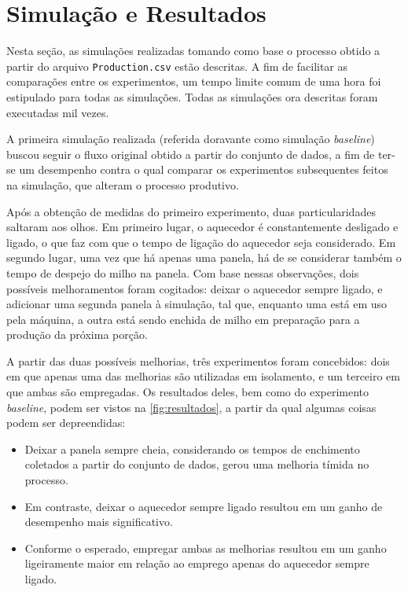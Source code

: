 \documentclass[12pt]{article}
\begin{document}
\section{Simulação e Resultados}
\label{sec:simulacao_resultados}

Nesta seção, as simulações realizadas tomando como base o processo obtido a partir do arquivo \texttt{Production.csv} estão descritas. A fim de facilitar as comparações entre os experimentos, um tempo limite comum de uma hora foi estipulado para todas as simulações. Todas as simulações ora descritas foram executadas mil vezes.

A primeira simulação realizada (referida doravante como simulação \textit{baseline}) buscou seguir o fluxo original obtido a partir do conjunto de dados, a fim de ter-se um desempenho contra o qual comparar os experimentos subsequentes feitos na simulação, que alteram o processo produtivo.

Após a obtenção de medidas do primeiro experimento, duas particularidades saltaram aos olhos. Em primeiro lugar, o aquecedor é constantemente desligado e ligado, o que faz com que o tempo de ligação do aquecedor seja considerado. Em segundo lugar, uma vez que há apenas uma panela, há de se considerar também o tempo de despejo do milho na panela. Com base nessas observações, dois possíveis melhoramentos foram cogitados: deixar o aquecedor sempre ligado, e adicionar uma segunda panela à simulação, tal que, enquanto uma está em uso pela máquina, a outra está sendo enchida de milho em preparação para a produção da próxima porção.

A partir das duas possíveis melhorias, três experimentos foram concebidos: dois em que apenas uma das melhorias são utilizadas em isolamento, e um terceiro em que ambas são empregadas. Os resultados deles, bem como do experimento \textit{baseline}, podem ser vistos na \autoref{fig:resultados}, a partir da qual algumas coisas podem ser depreendidas:

\begin{itemize}
    \item Deixar a panela sempre cheia, considerando os tempos de enchimento coletados a partir do conjunto de dados, gerou uma melhoria tímida no processo.
    \item Em contraste, deixar o aquecedor sempre ligado resultou em um ganho de desempenho mais significativo.
    \item Conforme o esperado, empregar ambas as melhorias resultou em um ganho ligeiramente maior em relação ao emprego apenas do aquecedor sempre ligado.
\end{itemize}
\end{document}
